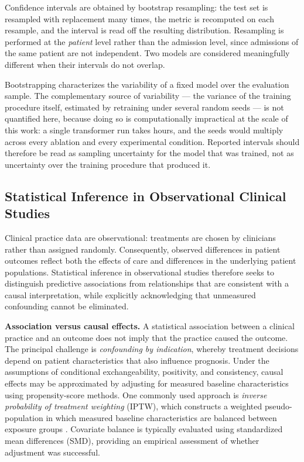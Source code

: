 Confidence intervals are obtained by bootstrap resampling: the test set is resampled with replacement many times, the metric is recomputed on each resample, and the interval is read off the resulting distribution. Resampling is performed at the \emph{patient} level rather than the admission level, since admissions of the same patient are not independent. Two models are considered meaningfully different when their intervals do not overlap.

Bootstrapping characterizes the variability of a fixed model over the evaluation sample. The complementary source of variability --- the variance of the training procedure itself, estimated by retraining under several random seeds --- is not quantified here, because doing so is computationally impractical at the scale of this work: a single transformer run takes hours, and the seeds would multiply across every ablation and every experimental condition. Reported intervals should therefore be read as sampling uncertainty for the model that was trained, not as uncertainty over the training procedure that produced it.

\subsection{Statistical Inference in Observational Clinical Studies}
\label{sec:prelim-causal}

Clinical practice data are observational: treatments are chosen by
clinicians rather than assigned randomly. Consequently, observed
differences in patient outcomes reflect both the effects of care and
differences in the underlying patient populations. Statistical inference
in observational studies therefore seeks to distinguish predictive
associations from relationships that are consistent with a causal
interpretation, while explicitly acknowledging that unmeasured
confounding cannot be eliminated.

\textbf{Association versus causal effects.}
A statistical association between a clinical practice and an outcome does
not imply that the practice caused the outcome. The principal challenge
is \emph{confounding by indication}, whereby treatment decisions depend
on patient characteristics that also influence prognosis. Under the
assumptions of conditional exchangeability, positivity, and consistency,
causal effects may be approximated by adjusting for measured baseline
characteristics using propensity-score methods. One commonly used
approach is \emph{inverse probability of treatment weighting} (IPTW),
which constructs a weighted pseudo-population in which measured baseline
characteristics are balanced between exposure groups
\citep{rosenbaum1983central,austin2015moving}. Covariate balance is
typically evaluated using standardized mean differences (SMD), providing
an empirical assessment of whether adjustment was successful.


